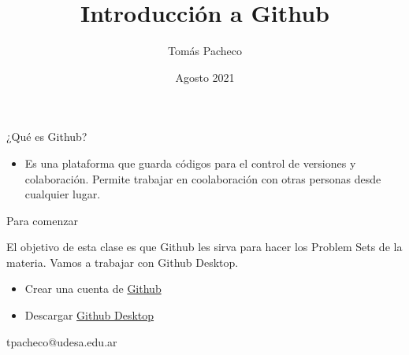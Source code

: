 \documentclass{beamer}					%
\title{Introducción a Github}
\author{Tom\'as Pacheco}
\institute{Econom\'ia Aplicada - Universidad de San Andr\'es}
\date{Agosto 2021}
\begin{document}
\begin{frame}
  \titlepage
\end{frame}

\begin{frame}{¿Qué es Github?}

\begin{itemize}
    \item Es una plataforma que guarda c\'odigos para el control de versiones y colaboraci\'on. Permite trabajar en coolaboraci\'on con otras personas desde cualquier lugar. 
\end{itemize}
\end{frame}

\begin{frame}{Para comenzar}

El objetivo de esta clase es que Github les sirva para hacer los Problem Sets de la materia. Vamos a trabajar con Github Desktop.
\begin{itemize}
    \item Crear una cuenta de \href{https://bit.ly/3kuoEd4}{Github} 
    \item Descargar \href{https://desktop.github.com/}{Github Desktop}
\end{itemize}  
\end{frame}


\begin{frame}{}
\begin{huge}
\begin{center}
    tpacheco@udesa.edu.ar
\end{center}
\end{huge}
\end{frame}
\end{document}
